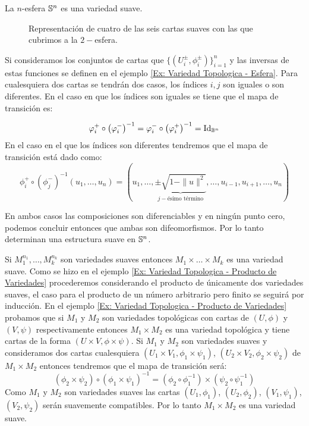 \begin{example}[$n-$Esfera]
	La $n$-esfera $\S^n$ es una variedad suave. 

\begin{figure}[h]
	\begin{center}
		
		\caption{Representación de cuatro de las seis cartas suaves con las que cubrimos a la $2-$esfera.}
	\end{center}
\end{figure}



  Si consideramos los conjuntos de cartas que $\{(U_i^{\pm}, \phi_{i}^{\pm})\}_{i=1}^{n}$ y las inversas de estas funciones se definen en el ejemplo \ref{Ex: Variedad Topologica - Esfera}. Para cualesquiera dos cartas se tendrán dos casos, los índices $i,j$ son iguales o son diferentes. En el caso en que los índices son iguales se tiene que el mapa de transición es:

	\[ \phi_i^{+} \circ \left(\phi_{i}^{-}\right)^{-1} = \phi_i^{-} \circ \left(\phi_{i}^{+}\right)^{-1} = \id_{\B^n} \]
	En el caso en el que los índices son diferentes tendremos que el mapa de transición está dado como:
	\[ \phi_i^{+} \circ \left(\phi_{j}^{-}\right)^{-1}(u_1, \dots, u_n) = \left(u_1, \dots, \underbrace{\pm \sqrt{1 - \|u\|^2}}_{j-\text{ésimo término}},\dots, u_{i-1}, u_{i+1}, \dots, u_{n} \right) \]

	En ambos casos las composiciones son diferenciables y en ningún punto cero, podemos concluir entonces que ambas son difeomorfismos. Por lo tanto determinan una estructura suave en $\S^n$.
\end{example}


\begin{example}\label{Ex: Variedad Suave - Producto de Variedades Suaves}
	Si $M_1^{n_1},\dots,M_k^{n_k}$ son variedades suaves entonces $M_1 \times \dots \times M_k$ es una variedad suave. Como se hizo en el ejemplo \ref{Ex: Variedad Topologica - Producto de Variedades} procederemos considerando el producto de únicamente dos variedades suaves, el caso para el producto de un número arbitrario pero finito se seguirá por inducción.
	En el ejemplo \ref{Ex: Variedad Topologica - Producto de Variedades} probamos que si $M_1$ y $M_2$ son variedades topológicas con cartas de $(U,\phi)$ y $(V,\psi)$ respectivamente entonces $M_1 \times M_2$ es una variedad topológica y tiene cartas de la forma $(U \times V,\phi \times \psi)$. Si $M_1$ y $M_2$ son variedades suaves y consideramos dos cartas cualesquiera $(U_1 \times V_1, \phi_1 \times \psi_1)$, $(U_2 \times V_2, \phi_2 \times \psi_2)$ de $M_1 \times M_2$ entonces tendremos que el mapa de transición será:
	\[
		(\phi_2 \times \psi_2) \circ (\phi_1 \times \psi_1)^{-1} = (\phi_2 \circ \phi_1^{-1}) \times (\psi_2 \circ \psi_1^{-1})
	\]
	Como $M_1$ y $M_2$ son variedades suaves las cartas $(U_1,\phi_1)$, $(U_2,\phi_2)$, $(V_1,\psi_1)$, $(V_2,\psi_2)$ serán suavemente compatibles. Por lo tanto $M_1 \times M_2$ es una variedad suave.
\end{example}

